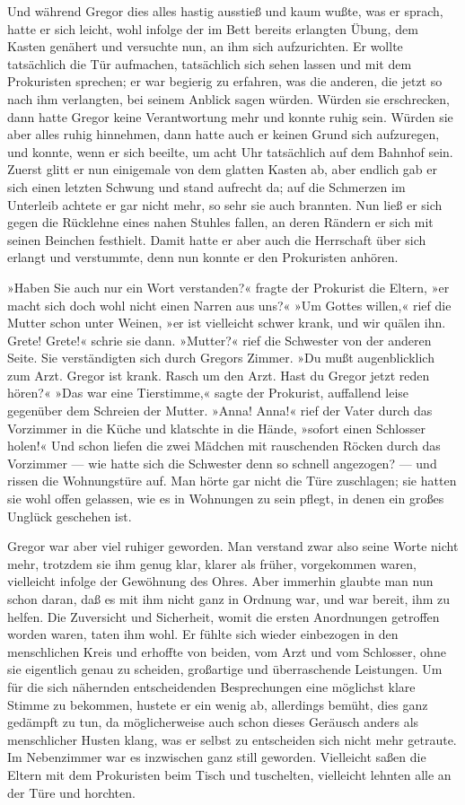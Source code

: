Und während Gregor dies alles hastig ausstieß und kaum wußte, was er
sprach, hatte er sich leicht, wohl infolge der im Bett bereits erlangten
Übung, dem Kasten genähert und versuchte nun, an ihm sich aufzurichten.
Er wollte tatsächlich die Tür aufmachen, tatsächlich sich sehen lassen
und mit dem Prokuristen sprechen; er war begierig zu erfahren, was die
anderen, die jetzt so nach ihm verlangten, bei seinem Anblick sagen
würden. Würden sie erschrecken, dann hatte Gregor keine Verantwortung
mehr und konnte ruhig sein. Würden sie aber alles ruhig hinnehmen, dann
hatte auch er keinen Grund sich aufzuregen, und konnte, wenn er sich
beeilte, um acht Uhr tatsächlich auf dem Bahnhof sein. Zuerst glitt er
nun einigemale von dem glatten Kasten ab, aber endlich gab er sich
einen letzten Schwung und stand aufrecht da; auf die Schmerzen im
Unterleib achtete er gar nicht mehr, so sehr sie auch brannten. Nun ließ
er sich gegen die Rücklehne eines nahen Stuhles fallen, an deren Rändern
er sich mit seinen Beinchen festhielt. Damit hatte er aber auch die
Herrschaft über sich erlangt und verstummte, denn nun konnte er den
Prokuristen anhören.

»Haben Sie auch nur ein Wort verstanden?« fragte der Prokurist die
Eltern, »er macht sich doch wohl nicht einen Narren aus uns?« »Um Gottes
willen,« rief die Mutter schon unter Weinen, »er ist vielleicht schwer
krank, und wir quälen ihn. Grete! Grete!« schrie sie dann. »Mutter?«
rief die Schwester von der anderen Seite. Sie verständigten sich durch
Gregors Zimmer. »Du mußt augenblicklich zum Arzt. Gregor ist krank.
Rasch um den Arzt. Hast du Gregor jetzt reden hören?« »Das war eine
Tierstimme,« sagte der Prokurist, auffallend leise gegenüber dem
Schreien der Mutter. »Anna! Anna!« rief der Vater durch das Vorzimmer in
die Küche und klatschte in die Hände, »sofort einen Schlosser holen!«
Und schon liefen die zwei Mädchen mit rauschenden Röcken durch das
Vorzimmer --- wie hatte sich die Schwester denn so schnell angezogen? ---
und rissen die Wohnungstüre auf. Man hörte gar nicht die Türe
zuschlagen; sie hatten sie wohl offen gelassen, wie es in Wohnungen zu
sein pflegt, in denen ein großes Unglück geschehen ist.

Gregor war aber viel ruhiger geworden. Man verstand zwar also seine
Worte nicht mehr, trotzdem sie ihm genug klar, klarer als früher,
vorgekommen waren, vielleicht infolge der Gewöhnung des Ohres. Aber
immerhin glaubte man nun schon daran, daß es mit ihm nicht ganz in
Ordnung war, und war bereit, ihm zu helfen. Die Zuversicht und
Sicherheit, womit die ersten Anordnungen getroffen worden waren, taten
ihm wohl. Er fühlte sich wieder einbezogen in den menschlichen Kreis und
erhoffte von beiden, vom Arzt und vom Schlosser, ohne sie eigentlich
genau zu scheiden, großartige und überraschende Leistungen. Um für die
sich nähernden entscheidenden Besprechungen eine möglichst klare Stimme
zu bekommen, hustete er ein wenig ab, allerdings bemüht, dies ganz
gedämpft zu tun, da möglicherweise auch schon dieses Geräusch anders als
menschlicher Husten klang, was er selbst zu entscheiden sich nicht mehr
getraute. Im Nebenzimmer war es inzwischen ganz still geworden.
Vielleicht saßen die Eltern mit dem Prokuristen beim Tisch und
tuschelten, vielleicht lehnten alle an der Türe und horchten.

